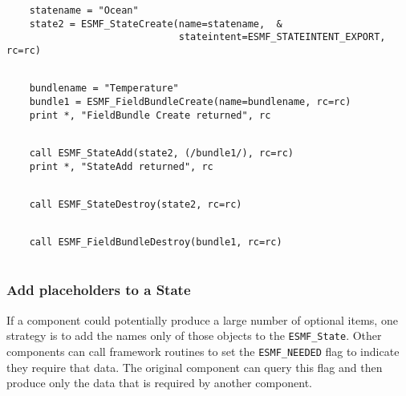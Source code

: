  \begin{verbatim}
    statename = "Ocean"
    state2 = ESMF_StateCreate(name=statename,  &
                              stateintent=ESMF_STATEINTENT_EXPORT, rc=rc)  
 
\end{verbatim}
 

 \begin{verbatim}
    bundlename = "Temperature"
    bundle1 = ESMF_FieldBundleCreate(name=bundlename, rc=rc)
    print *, "FieldBundle Create returned", rc
 
\end{verbatim}
 

 \begin{verbatim}
    call ESMF_StateAdd(state2, (/bundle1/), rc=rc)
    print *, "StateAdd returned", rc
 
\end{verbatim}
 

 \begin{verbatim}
    call ESMF_StateDestroy(state2, rc=rc)
 
\end{verbatim}
 

 \begin{verbatim}
    call ESMF_FieldBundleDestroy(bundle1, rc=rc)
 
\end{verbatim}
 

  \subsubsection{Add placeholders to a State}
     
   If a component could potentially produce a large number of optional
   items, one strategy is to add the names only of those objects to the
   {\tt ESMF\_State}.  Other components can call framework routines to
   set the {\tt ESMF\_NEEDED} flag to indicate they require that data.
   The original component can query this flag and then produce only the
   data that is required by another component. 

